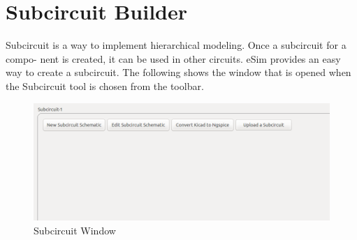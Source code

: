 \chapter{Subcircuit Builder}
\label{chap8}
Subcircuit is a way to implement hierarchical modeling. Once a subcircuit for a compo-
nent is created, it can be used in other circuits. eSim provides an easy way to create
a subcircuit. The following  shows the window that is opened when the Subcircuit tool is chosen from the toolbar.
\begin{figure}[!htp]
\centering
\includegraphics[width =\lgfig]{subcirciut_window.png}
\caption{Subcircuit Window}
\label{subcircuit_mainwin}
\end{figure}


